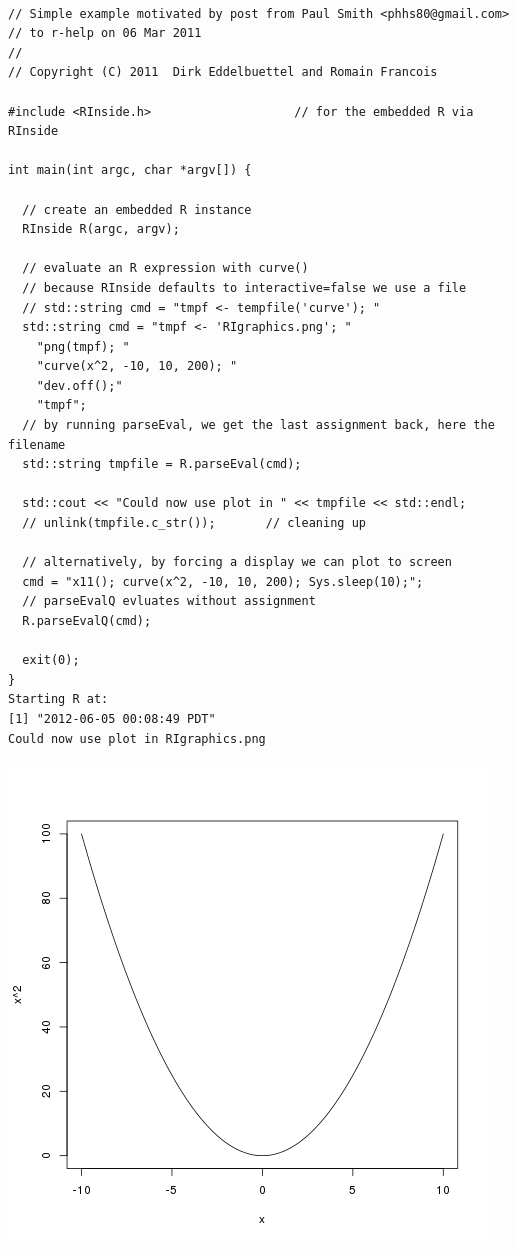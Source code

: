 \documentclass[11pt]{article}
\begin{document}
\begin{verbatim}

// Simple example motivated by post from Paul Smith <phhs80@gmail.com>
// to r-help on 06 Mar 2011
//
// Copyright (C) 2011  Dirk Eddelbuettel and Romain Francois

#include <RInside.h>                    // for the embedded R via RInside

int main(int argc, char *argv[]) {

  // create an embedded R instance
  RInside R(argc, argv);               

  // evaluate an R expression with curve() 
  // because RInside defaults to interactive=false we use a file
  // std::string cmd = "tmpf <- tempfile('curve'); " 
  std::string cmd = "tmpf <- 'RIgraphics.png'; "
    "png(tmpf); "
    "curve(x^2, -10, 10, 200); "
    "dev.off();"
    "tmpf";
  // by running parseEval, we get the last assignment back, here the filename
  std::string tmpfile = R.parseEval(cmd);

  std::cout << "Could now use plot in " << tmpfile << std::endl;
  // unlink(tmpfile.c_str());		// cleaning up

  // alternatively, by forcing a display we can plot to screen
  cmd = "x11(); curve(x^2, -10, 10, 200); Sys.sleep(10);";
  // parseEvalQ evluates without assignment
  R.parseEvalQ(cmd);
    
  exit(0);
}
Starting R at:
[1] "2012-06-05 00:08:49 PDT"
Could now use plot in RIgraphics.png
\end{verbatim}


\includegraphics[width=.9\linewidth]{./RIgraphics.png}
\end{document}
